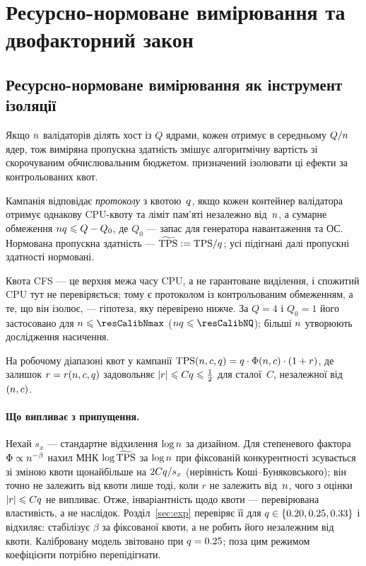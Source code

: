\section{Ресурсно-нормоване вимірювання та двофакторний закон}
\label{sec:model}

\subsection{Ресурсно-нормоване вимірювання як інструмент ізоляції}

Якщо $n$ валідаторів ділять хост із $Q$ ядрами, кожен отримує в середньому
$Q/n$ ядер, тож виміряна пропускна здатність змішує алгоритмічну вартість зі
скорочуваним обчислювальним бюджетом. \RNM{} призначений ізолювати ці ефекти за
контрольованих квот.

\begin{Def}
\label{def:rnm}
Кампанія відповідає \emph{протоколу \RNM{}} з квотою~$q$, якщо кожен контейнер
валідатора отримує однакову CPU-квоту та ліміт пам'яті незалежно від~$n$, а
сумарне обмеження $nq\leqslant Q-Q_{0}$, де $Q_{0}$ --- запас для генератора
навантаження та ОС. Нормована пропускна здатність --- $\widetilde{\mathrm{TPS}}\mathrel{\mathop:}=\mathrm{TPS}/q$; усі
підігнані далі пропускні здатності нормовані.
\end{Def}

Квота CFS --- це верхня межа часу CPU, а не гарантоване виділення, і спожитий
CPU тут не перевіряється; тому \RNM{} є протоколом із контрольованим обмеженням,
а те, що він ізолює, --- гіпотеза, яку перевірено нижче. За $Q=4$ і $Q_{0}=1$
його застосовано для $\n\le\resCalibNmax$ ($\n\q\le\resCalibNQ$); більші $n$
утворюють дослідження насичення.

\begin{Assumption}
\label{as:separable}
На робочому діапазоні квот у кампанії
$\mathrm{TPS}(n,c,q)=q\cdot\Phi(n,c)\cdot(1+r)$, де залишок
$r=r(n,c,q)$ задовольняє $|r|\leqslant Cq\leqslant\tfrac12$ для сталої~$C$,
незалежної від~$(n,c)$.
\end{Assumption}

\paragraph{Що випливає з припущення.}
Нехай $s_x$ --- стандартне відхилення $\log n$ за дизайном. Для степеневого
фактора $\Phi\propto n^{-\beta}$ нахил МНК $\log\widetilde{\mathrm{TPS}}$ за $\log n$ при фіксованій
конкурентності зсувається зі зміною квоти щонайбільше на $2Cq/s_x$
(нерівність Коші--Буняковського); він точно не залежить від квоти лише тоді, коли
$r$ не залежить від~$n$, чого з оцінки $|r|\leqslant Cq$ не випливає. Отже,
інваріантність щодо квоти --- перевірювана властивість, а не наслідок.
Розділ~\ref{sec:exp} перевіряє її для $q\in\{0.20,0.25,0.33\}$ і відхиляє:
\RNM{} стабілізує $\beta$ за фіксованої квоти, а не робить його незалежним від
квоти. Калібровану модель звітовано при $q=0.25$; поза цим режимом коефіцієнти
потрібно перепідігнати.

